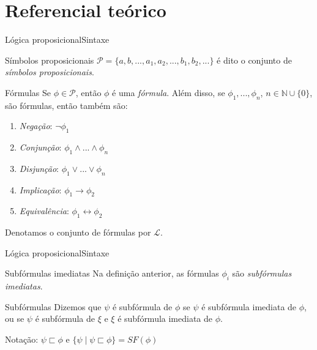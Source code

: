 
\section{Referencial teórico}

\begin{frame}{Lógica proposicional}{Sintaxe}
	\vspace{-.2cm}
	\begin{footnotesize}
	\begin{block}{Símbolos proposicionais}
		$\mathcal{P} = \{a,b,...,a_1,a_2,...,b_1,b_2,... \}$ é dito o conjunto de \emph{símbolos proposicionais}.
	\end{block}
	\pause
	\vspace{-.2cm}
	\begin{block}{Fórmulas}
		Se $\phi \in \mathcal{P}$, então $\phi$ é uma \emph{fórmula}. Além disso, se $\phi_1,...,\phi_n$, $n \in \mathbb{N} \cup \{0 \}$, são fórmulas, então também são:
		\begin{enumerate}
			\pause\item \emph{Negação}: $\neg \phi_1$
			\pause\item \emph{Conjunção}: $\phi_1 \wedge ... \wedge \phi_n$
			\pause\item \emph{Disjunção}: $\phi_1 \vee ... \vee \phi_n$
			\pause\item \emph{Implicação}: $\phi_1 \rightarrow \phi_2$
			\pause\item \emph{Equivalência}: $\phi_1 \leftrightarrow \phi_2$
		\end{enumerate}
		\pause Denotamos o conjunto de fórmulas por $\mathcal{L}$.
	\end{block}
	\end{footnotesize}
\end{frame}

\begin{frame}{Lógica proposicional}{Sintaxe}
	\begin{block}{Subfórmulas imediatas}
		Na definição anterior, as fórmulas $\phi_i$ são \emph{subfórmulas imediatas}.
	\end{block}
	
	\pause
	\begin{block}{Subfórmulas}
		Dizemos que $\psi$ é subfórmula de $\phi$ se $\psi$ é subfórmula imediata de $\phi$, ou se $\psi$ é subfórmula de $\xi$ e $\xi$ é subfórmula imediata de $\phi$.
		
		\pause Notação: $\psi \sqsubset \phi$ e $\{\psi \mid \psi \sqsubset \phi \} = SF(\phi)$
	\end{block}
\end{frame}


